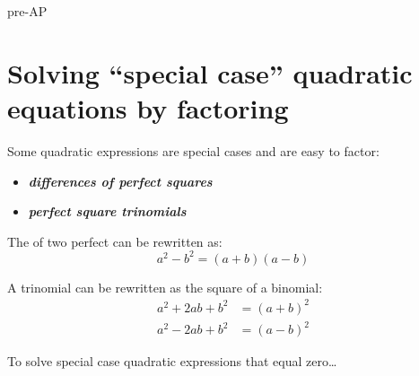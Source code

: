 \begin{taggedblock}{pre-AP}


\section*{Solving ``special case'' quadratic equations by factoring}

Some quadratic expressions are special cases 
and are easy to factor:
\begin{itemize}[itemsep=0in]
    \item {\bfseries\itshape differences of perfect squares}
    \item {\bfseries\itshape perfect square trinomials}
\end{itemize}

\begin{center}
    \begin{tcolorbox}[width=5.5in]
        The  of two perfect  can be rewritten as:
        \Large
        \[
            a^2 - b^2 = (a + b)(a-b)
        \]
    \end{tcolorbox}
\end{center}

\begin{center}
    \begin{tcolorbox}[width=5.5in]
        A  trinomial can be rewritten as the square of a binomial:
        \Large
        \begin{align*}
            a^2 + 2ab + b^2 &= (a + b)^2 \\
            a^2 - 2ab + b^2 &= (a -b)^2  
        \end{align*}
        \vspace{-1em}
    \end{tcolorbox}
\end{center}



\begin{myConceptSteps}{
    To solve special case quadratic expressions that equal zero\dots
}
\end{myConceptSteps}




\end{taggedblock}